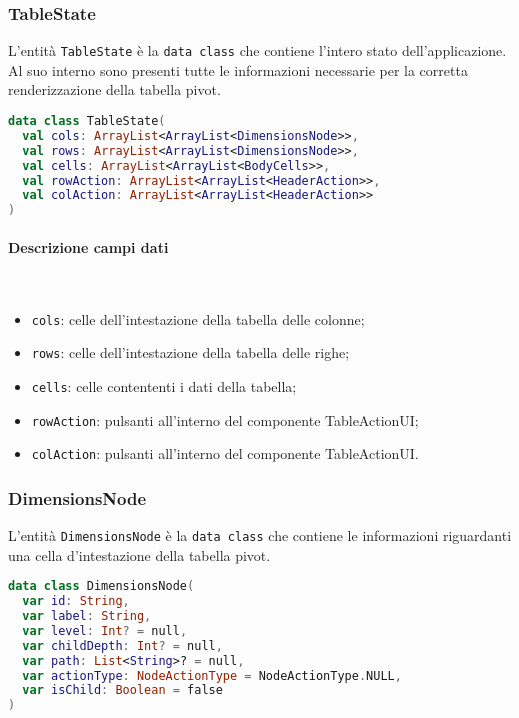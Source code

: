 \subsubsection{TableState}
L'entità \verb|TableState| è la \verb|data class| che contiene l'intero stato dell'applicazione. Al suo interno sono presenti tutte le informazioni necessarie per la corretta renderizzazione della tabella pivot.
\begin{lstlisting}[caption={TableState}, label={lst:tablestate}, language=Kotlin]
data class TableState(
  val cols: ArrayList<ArrayList<DimensionsNode>>,
  val rows: ArrayList<ArrayList<DimensionsNode>>,
  val cells: ArrayList<ArrayList<BodyCells>>,
  val rowAction: ArrayList<ArrayList<HeaderAction>>,
  val colAction: ArrayList<ArrayList<HeaderAction>>
)
\end{lstlisting}

\paragraph{Descrizione campi dati} \mbox{} \\
\begin{itemize}
	\item \verb|cols|: celle dell'intestazione della tabella delle colonne;
	\item \verb|rows|: celle dell'intestazione della tabella delle righe;
	\item \verb|cells|: celle contententi i dati della tabella;
	\item \verb|rowAction|: pulsanti all'interno del componente TableActionUI;
	\item \verb|colAction|: pulsanti all'interno del componente TableActionUI.
\end{itemize}

\subsubsection{DimensionsNode}
L'entità \verb|DimensionsNode| è la \verb|data class| che contiene le informazioni riguardanti una cella d'intestazione della tabella pivot.
\begin{lstlisting}[caption={DimensionsNode}, label={lst:dimensionsnode}, language=Kotlin]
data class DimensionsNode(
  var id: String,
  var label: String,
  var level: Int? = null,
  var childDepth: Int? = null,
  var path: List<String>? = null,
  var actionType: NodeActionType = NodeActionType.NULL,
  var isChild: Boolean = false
)
\end{lstlisting}
